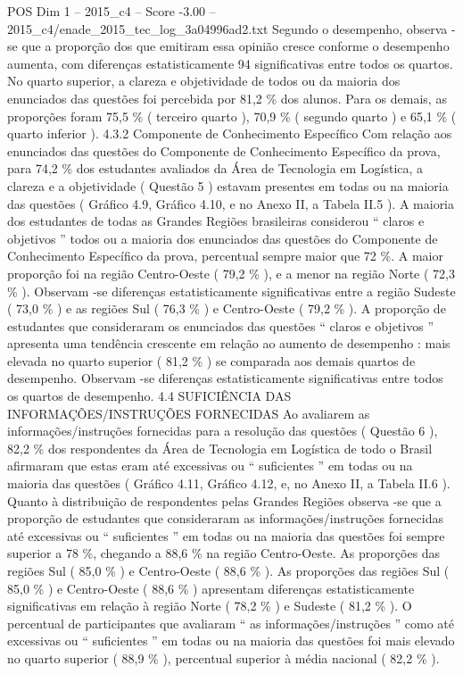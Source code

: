 \begin{textsample}{POS Dim 1 – 2015\_c4 – Score -3.00 – 2015\_c4/enade\_2015\_tec\_log\_3a04996ad2.txt}
Segundo o desempenho, observa -se que a proporção dos que emitiram essa opinião cresce conforme o desempenho aumenta, com diferenças estatisticamente 94 significativas entre todos os quartos.
No quarto superior, a clareza e objetividade de todos ou da maioria dos enunciados das questões foi percebida por 81,2 \% dos alunos.
Para os demais, as proporções foram 75,5 \% ( terceiro quarto ), 70,9 \% ( segundo quarto ) e 65,1 \% ( quarto inferior ). 4.3.2 Componente de Conhecimento Específico Com relação aos enunciados das questões do Componente de Conhecimento Específico da prova, para 74,2 \% dos estudantes avaliados da Área de Tecnologia em Logística, a clareza e a objetividade ( Questão 5 ) estavam presentes em todas ou na maioria das questões ( Gráfico 4.9, Gráfico 4.10, e no Anexo II, a Tabela II.5 ).
A maioria dos estudantes de todas as Grandes Regiões brasileiras considerou “ claros e objetivos ” todos ou a maioria dos enunciados das questões do Componente de Conhecimento Específico da prova, percentual sempre maior que 72 \%.
A maior proporção foi na região Centro-Oeste ( 79,2 \% ), e a menor na região Norte ( 72,3 \% ).
Observam -se diferenças estatisticamente significativas entre a região Sudeste ( 73,0 \% ) e as regiões Sul ( 76,3 \% ) e Centro-Oeste ( 79,2 \% ).
A proporção de estudantes que consideraram os enunciados das questões “ claros e objetivos ” apresenta uma tendência crescente em relação ao aumento de desempenho : mais elevada no quarto superior ( 81,2 \% ) se comparada aos demais quartos de desempenho.
Observam -se diferenças estatisticamente significativas entre todos os quartos de desempenho. 4.4 SUFICIÊNCIA DAS INFORMAÇÕES/INSTRUÇÕES FORNECIDAS Ao avaliarem as informações/instruções fornecidas para a resolução das questões ( Questão 6 ), 82,2 \% dos respondentes da Área de Tecnologia em Logística de todo o Brasil afirmaram que estas eram até excessivas ou “ suficientes ” em todas ou na maioria das questões ( Gráfico 4.11, Gráfico 4.12, e, no Anexo II, a Tabela II.6 ).
Quanto à distribuição de respondentes pelas Grandes Regiões observa -se que a proporção de estudantes que consideraram as informações/instruções fornecidas até excessivas ou “ suficientes ” em todas ou na maioria das questões foi sempre superior a 78 \%, chegando a 88,6 \% na região Centro-Oeste.
As proporções das regiões Sul ( 85,0 \% ) e Centro-Oeste ( 88,6 \% ).
As proporções das regiões Sul ( 85,0 \% ) e Centro-Oeste ( 88,6 \% ) apresentam diferenças estatisticamente significativas em relação à região Norte ( 78,2 \% ) e Sudeste ( 81,2 \% ).
O percentual de participantes que avaliaram “ as informações/instruções ” como até excessivas ou “ suficientes ” em todas ou na maioria das questões foi mais elevado no quarto superior ( 88,9 \% ), percentual superior à média nacional ( 82,2 \% ).

\end{textsample}
